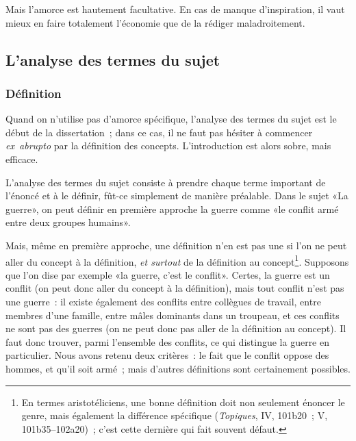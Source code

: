 \documentclass[a4paper,11pt]{article}
\begin{document}
\par

Mais l'amorce est hautement facultative. En cas de manque d'inspiration,
il vaut mieux en faire totalement l'économie que de la rédiger
maladroitement.



\subsection{L'analyse des termes du sujet}

\subsubsection{Définition}

Quand on n'utilise pas d'amorce spécifique, l'analyse des termes du
sujet est le début de la dissertation~; dans ce cas, il ne faut pas
hésiter à commencer \emph{ex~abrupto} par la définition des
concepts. L'introduction est alors sobre, mais efficace.

\par

L'analyse des termes du sujet consiste à prendre chaque terme important
de l'énoncé et à le définir, fût-ce simplement de manière
préalable. Dans le sujet «La guerre», on peut définir en première
approche la guerre comme «le conflit armé entre deux groupes humains».

\par

Mais, même en première approche, une définition n'en est pas une si l'on
ne peut aller du concept à la définition, \emph{et surtout} de la
définition au concept\footnote{En termes aristotéliciens, une bonne
  définition doit non seulement énoncer le genre, mais également la
  différence spécifique (\emph{Topiques}, IV, 101b20~; V,
  101b35--102a20)~; c'est cette dernière qui fait souvent
  défaut.}. Supposons que l'on dise par exemple «la guerre, c'est le
conflit». Certes, la guerre est un conflit (on peut donc aller du
concept à la définition), mais tout conflit n'est pas une guerre~: il
existe également des conflits entre collègues de travail, entre membres
d'une famille, entre mâles dominants dans un troupeau, et ces conflits
ne sont pas des guerres (on ne peut donc pas aller de la définition au
concept). Il faut donc trouver, parmi l'ensemble des conflits, ce qui
distingue la guerre en particulier. Nous avons retenu deux critères~: le
fait que le conflit oppose des hommes, et qu'il soit armé~; mais
d'autres définitions sont certainement possibles.
\end{document}
